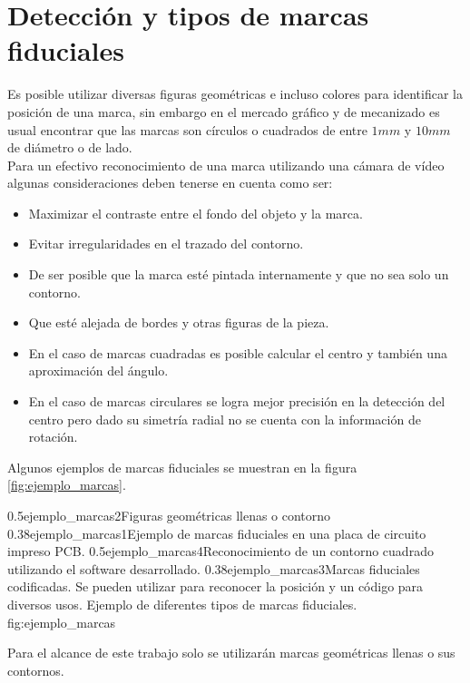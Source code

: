 \section{Detección y tipos de marcas fiduciales}
   Es posible utilizar diversas figuras geométricas e incluso colores para identificar la posición de una marca, sin embargo en el mercado gráfico y de mecanizado es usual encontrar que las marcas son círculos o cuadrados de entre $1mm$ y $10mm$ de diámetro o de lado.\\
   Para un efectivo reconocimiento de una marca utilizando una cámara de vídeo algunas consideraciones deben tenerse en cuenta como ser:
   \begin{itemize}
      \item{Maximizar el contraste entre el fondo del objeto y la marca.}
      \item{Evitar irregularidades en el trazado del contorno.}
      \item{De ser posible que la marca esté pintada internamente y que no sea solo un contorno.}
      \item{Que esté alejada de bordes y otras figuras de la pieza.}
      \item{En el caso de marcas cuadradas es posible calcular el centro y también una aproximación del ángulo.}
      \item{En el caso de marcas circulares se logra mejor precisión en la detección del centro pero dado su simetría radial no se cuenta con la información de rotación.}
   \end{itemize}
   Algunos ejemplos de marcas fiduciales se muestran en la figura \ref{fig:ejemplo_marcas}.

\subfigtwotwo
            {0.5}{ejemplo_marcas2}{Figuras geométricas llenas o contorno} 
            {0.38}{ejemplo_marcas1}{Ejemplo de marcas fiduciales en una placa de circuito impreso PCB.}
            {0.5}{ejemplo_marcas4}{Reconocimiento de un contorno cuadrado utilizando el software desarrollado.}
            {0.38}{ejemplo_marcas3}{Marcas fiduciales codificadas. Se pueden utilizar para reconocer la posición y un código para diversos usos.}
            {Ejemplo de diferentes tipos de marcas fiduciales.}
            {fig:ejemplo_marcas}

         Para el alcance de este trabajo solo se utilizarán marcas geométricas llenas o sus contornos.

